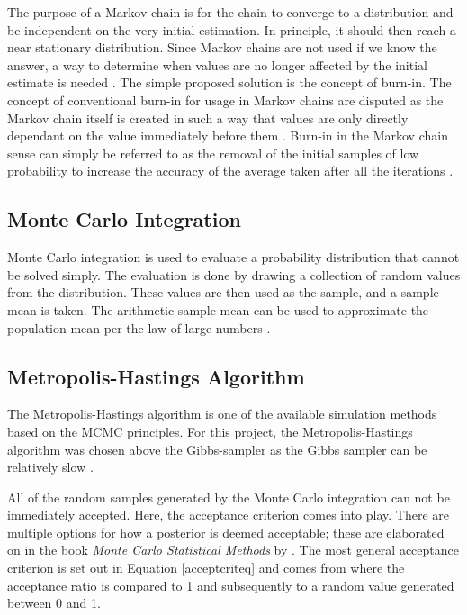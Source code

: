 	The purpose of a Markov chain is for the chain to converge to a distribution and be independent on the very initial estimation. 
	In principle, it should then reach a near stationary distribution.
	Since Markov chains are not used if we know the answer, a way to determine when values are no longer affected by the initial estimate is needed \citep{Gilks:1996}. 
	The simple proposed solution is the concept of burn-in. 
	The concept of conventional burn-in for usage in Markov chains are disputed as the Markov chain itself is created in such a way that values are only directly dependant on the value immediately before them \citep{Meyn:1993}.
	Burn-in in the Markov chain sense can simply be referred to as the removal of the initial samples of low probability to increase the accuracy of the average taken after all the iterations \citep{John:2016}.
		
	\subsection{Monte Carlo Integration}\label{MCint_sec}
	Monte Carlo integration is used to evaluate a probability distribution that cannot be solved simply. 
	The evaluation is done by drawing a collection of random values from the distribution.
	These values are then used as the sample, and a sample mean is taken.
	The arithmetic sample mean can be used to approximate the population mean per the law of large numbers \citep{Gilks:1996}.
	

\subsection{Metropolis-Hastings Algorithm}

The Metropolis-Hastings algorithm is one of the available simulation methods based on the MCMC principles. 
For this project, the Metropolis-Hastings algorithm was chosen above the Gibbs-sampler as the Gibbs sampler can be relatively slow \citep{Murphy:2012}.

All of the random samples generated by the Monte Carlo integration can not be immediately accepted.
	Here, the acceptance criterion comes into play.
	There are multiple options for how a posterior is deemed acceptable; these are elaborated on in the book  \textit{Monte Carlo Statistical Methods} by \citeauthor{Robert:2004}. 
	The most general acceptance criterion is set out in Equation \ref{acceptcriteq} and comes from \citet{Kaipo:2005} where the acceptance ratio is compared to 1 and subsequently to a random value generated between 0 and 1.
	
